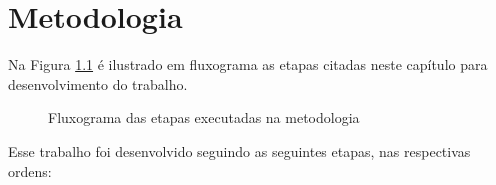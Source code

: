 \chapter{Metodologia}

Na Figura \ref{fig:metodologia} é ilustrado em fluxograma as etapas citadas neste capítulo para desenvolvimento do trabalho.

\begin{figure}[H]
    \centering
    \caption{Fluxograma das etapas executadas na metodologia}
    \label{fig:metodologia}
\end{figure}

Esse trabalho foi desenvolvido seguindo as seguintes etapas, nas respectivas ordens: 

